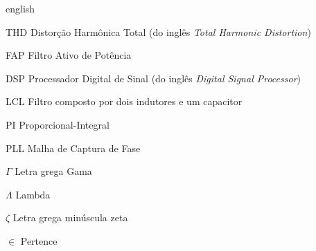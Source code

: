\documentclass[12pt,openright,twoside,a4paper,english,french,spanish,
                sumario=tradicional,brazil]{abntex2}
\begin{document}

\begin{resumo}
 
\end{resumo}

\begin{resumo}[Abstract]
 \begin{otherlanguage*}{english}
  
 \end{otherlanguage*}
\end{resumo}

\listoffigures*
\cleardoublepage

\listoftables*
\cleardoublepage

\begin{siglas}
 \item[THD] Distorção Harmônica Total (do inglês \emph{Total Harmonic Distortion})
 \item[FAP] Filtro Ativo de Potência
 \item[DSP] Processador Digital de Sinal (do inglês \emph{Digital Signal Processor})
 \item[LCL] Filtro composto por dois indutores e um capacitor
 \item[PI]  Proporcional-Integral
 \item[PLL] Malha de Captura de Fase
\end{siglas}

\begin{simbolos}
 \item[$ \Gamma $] Letra grega Gama
 \item[$ \Lambda $] Lambda
 \item[$ \zeta $] Letra grega minúscula zeta
 \item[$ \in $] Pertence
\end{simbolos}

\tableofcontents*
\cleardoublepage



\textual

\end{document}

